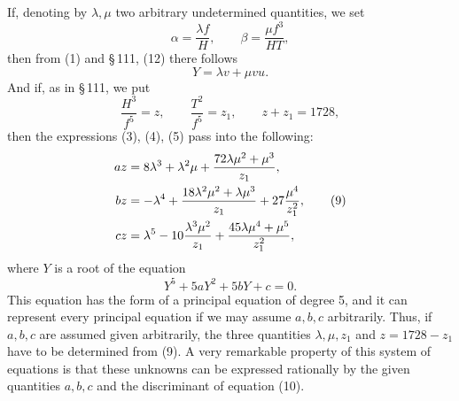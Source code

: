 \documentclass[11pt]{article}
\begin{document}
If, denoting by \(\lambda,\mu\) two arbitrary undetermined quantities, we set
\begin{equation}
\alpha=\frac{\lambda f}{H},
\qquad
\beta=\frac{\mu f^3}{HT},
\tag{6}
\end{equation}
then from (1) and \S\,111, (12) there follows
\begin{equation}
Y=\lambda v+\mu vu.
\tag{7}
\end{equation}
And if, as in \S\,111, we put
\begin{equation}
\frac{H^3}{f^5}=z,
\qquad
\frac{T^2}{f^5}=z_1,
\qquad
z+z_1=1728,
\tag{8}
\end{equation}
then the expressions (3), (4), (5) pass into the following:
\begin{align}
az&=8\lambda^3+\lambda^2\mu+\frac{72\lambda\mu^2+\mu^3}{z_1},\notag\\
bz&=-\lambda^4+\frac{18\lambda^2\mu^2+\lambda\mu^3}{z_1}+27\frac{\mu^4}{z_1^2},\tag{9}\\
cz&=\lambda^5-10\frac{\lambda^3\mu^2}{z_1}+\frac{45\lambda\mu^4+\mu^5}{z_1^2},\notag
\end{align}
where \(Y\) is a root of the equation
\begin{equation}
Y^5+5aY^2+5bY+c=0.
\tag{10}
\end{equation}
This equation has the form of a principal equation of degree 5, and it can represent every principal equation if we may assume \(a,b,c\) arbitrarily. Thus, if \(a,b,c\) are assumed given arbitrarily, the three quantities \(\lambda,\mu,z_1\) and \(z=1728-z_1\) have to be determined from (9). A very remarkable property of this system of equations is that these unknowns can be expressed rationally by the given quantities \(a,b,c\) and the discriminant of equation (10).
\end{document}
